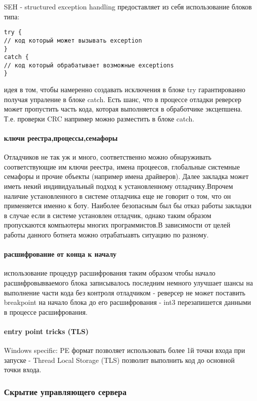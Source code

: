 SEH - structured exception handling предоставляет из себя использование блоков типа:
\begin{verbatim}
try {
// код который может вызывать exception
}
catch {
// код который обрабатывает возможные exceptions
}
\end{verbatim}
идея в том, чтобы намеренно создавать исключения в блоке try гарантированно
получая упраление в блоке catch. Есть шанс, что в процессе отладки реверсер может
пропустить часть кода, которая выполняется в обработчике эксцепшена. Т.е. проверки
CRC например можно разместить в блоке catch.

\paragraph{ключи реестра,процессы,семафоры\\}
Отладчиков не так уж и много, соответственно можно обнаруживать соответствующие им ключи реестра, имена процеесов, глобальные системные семафоры и прочие объекты (например имена драйверов). Далее закладка может иметь некий индивидуальный подход к установленному отладчику.Впрочем наличие установленного в системе отладчика еще не говорит о том, что он применяется именно к боту. Наиболее безопасным был бы отказ работы закладки в случае если в системе установлен отладчик, однако таким образом пропускаются компьютеры многих программистов.В зависимости от целей работы данного ботнета можно отрабатыавть ситуацию по разному.

\paragraph{расшифрование от конца к началу\\}
использование процедур расшифрования таким образом чтобы начало расшифровывваемого блока записывалось последним немного улучшает шансы на выполнение части кода без контроля
отладчиком - реверсер не может поставить breakpoint на начало блока до его расшифрования
 - int3 перезапишется данными в процессе расшифрования.

\paragraph{entry point tricks (TLS)\\}
Windows specific: PE формат позволяет использовать более 1й точки входа при запуске -
Thread Local Storage (TLS) позволит выполнить код до основной точки входа.

\subsubsection{Скрытие управляющего сервера}

